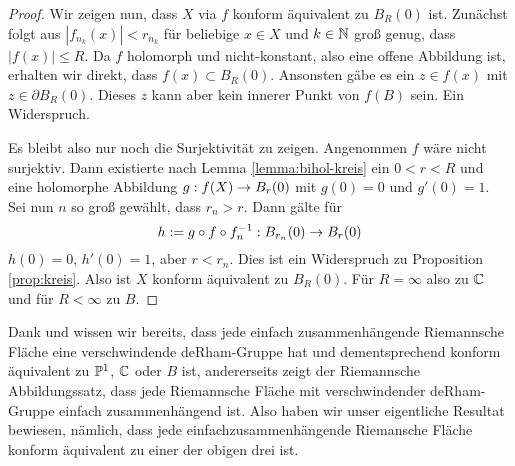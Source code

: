 \begin{proof}
  Wir zeigen nun, dass $X$ via $f$ konform äquivalent zu $B_R(0)$ ist.
  Zunächst folgt aus $|f_{n_k}(x)| < r_{n_k}$ für beliebige $x \in X$
  und $k \in \N$ groß genug, dass $|f(x)| \leq R$. Da $f$
  holomorph und nicht-konstant, also eine offene Abbildung ist, erhalten wir direkt,
  dass $f(x) \subset B_R(0)$. Ansonsten gäbe es ein $z \in f(x)$ mit
  $z \in \partial B_R(0)$. Dieses $z$ kann aber kein innerer Punkt von
  $f(B)$ sein. Ein Widerspruch. 

  Es bleibt also nur noch die Surjektivität zu zeigen. 
  Angenommen $f$ wäre nicht surjektiv. Dann existierte nach Lemma
  \ref{lemma:bihol-kreis} ein $0 < r < R$ und eine holomorphe
  Abbildung $g: f(X) \ra B_r(0)$ mit $g(0) = 0$ und $g'(0) = 1$. 
  Sei nun $n$ so groß gewählt, dass $r_n > r$. Dann gälte für
  \[
  h:= g \circ f \circ f^{-1}_n : B_{r_n}(0) \ra B_r(0)
  \]
  $h(0)=0$, $h'(0) = 1$, aber $r < r_n$. Dies ist ein Widerspruch zu
  Proposition \ref{prop:kreis}. 
  Also ist $X$ konform äquivalent zu $B_R(0)$. Für $R = \infty$ also
  zu $\C$ und für $R < \infty$ zu $B$.
\end{proof}

\begin{rem}
  Dank \cite[Kor.16]{For} und \cite[Kor.10.7]{For} wissen wir bereits,
  dass jede einfach zusammenhängende Riemannsche
  Fläche eine verschwindende deRham-Gruppe hat und dementsprechend
  konform äquivalent zu $\P^1$, $\C$ oder $B$ ist, andererseits zeigt
  der Riemannsche Abbildungssatz, dass jede Riemannsche Fläche mit
  verschwindender deRham-Gruppe einfach zusammenhängend ist. Also
  haben wir unser eigentliche Resultat bewiesen, nämlich, dass jede
  einfachzusammenhängende Riemansche Fläche konform äquivalent zu
  einer der obigen drei ist.
\end{rem}

